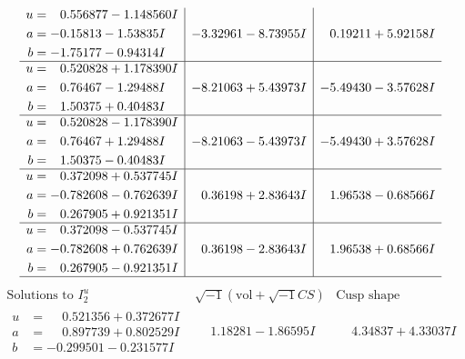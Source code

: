 \documentclass[1p]{elsarticle_modified}
\theoremstyle{definition}
\newcommand{\I}{\sqrt{-1}}
\begin{document}
$$\begin{array}{c|c|c}
\begin{aligned}
u &= \phantom{-}0.556877 - 1.148560 I \\
a &= -0.15813 - 1.53835 I \\
b &= -1.75177 - 0.94314 I\end{aligned}
 & -3.32961 - 8.73955 I & \phantom{-}0.19211 + 5.92158 I \\ \hline\begin{aligned}
u &= \phantom{-}0.520828 + 1.178390 I \\
a &= \phantom{-}0.76467 - 1.29488 I \\
b &= \phantom{-}1.50375 + 0.40483 I\end{aligned}
 & -8.21063 + 5.43973 I & -5.49430 - 3.57628 I \\ \hline\begin{aligned}
u &= \phantom{-}0.520828 - 1.178390 I \\
a &= \phantom{-}0.76467 + 1.29488 I \\
b &= \phantom{-}1.50375 - 0.40483 I\end{aligned}
 & -8.21063 - 5.43973 I & -5.49430 + 3.57628 I \\ \hline\begin{aligned}
u &= \phantom{-}0.372098 + 0.537745 I \\
a &= -0.782608 - 0.762639 I \\
b &= \phantom{-}0.267905 + 0.921351 I\end{aligned}
 & \phantom{-}0.36198 + 2.83643 I & \phantom{-}1.96538 - 0.68566 I \\ \hline\begin{aligned}
u &= \phantom{-}0.372098 - 0.537745 I \\
a &= -0.782608 + 0.762639 I \\
b &= \phantom{-}0.267905 - 0.921351 I\end{aligned}
 & \phantom{-}0.36198 - 2.83643 I & \phantom{-}1.96538 + 0.68566 I\\
 \hline 
 \end{array}$$\newpage$$\begin{array}{c|c|c}  
\text{Solutions to }I^u_{2}& \I (\text{vol} + \sqrt{-1}CS) & \text{Cusp shape}\\
 \hline 
\begin{aligned}
u &= \phantom{-}0.521356 + 0.372677 I \\
a &= \phantom{-}0.897739 + 0.802529 I \\
b &= -0.299501 - 0.231577 I\end{aligned}
 & \phantom{-}1.18281 - 1.86595 I & \phantom{-}4.34837 + 4.33037 I \\ \hline\begin{aligned}

\end{aligned}
\end{array}$$
\end{document}
